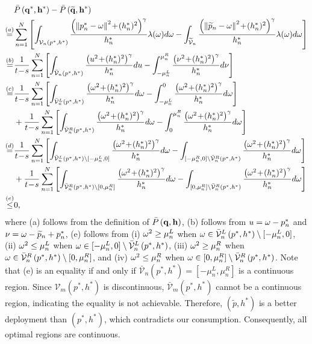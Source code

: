 \documentclass[smallabstract,smallcaptions]{dccpaper}
\renewcommand{\vp}{\mathbf q}
\newcommand{\df}{\ensuremath{\lam}}         %
\newcommand{\bP}{\ensuremath{\vp}}          %
\newcommand{\abPo}{\ensuremath{\bar{P}}}  %
\newcommand{\bH}{\ensuremath{\vh}}          %
\newcommand{\Vor}{\ensuremath{\mathcal{V}}}         %
\begin{document}
\begin{equation}
\begin{aligned}
    &\abPo\left(\bP^*,\bH^*\right) - \abPo\left(\widetilde{\bP},\bH^*\right)\\
    \overset{(a)}{=}&\sum_{n=1}^{N}\left[\int_{\Vor_n\left(p^*, h^*\right)}  \frac{ \left(\Norm{p^*_n- \ome}^2 \!+\!(h^*_n)^2\right)^{\gam}}{h^*_n} \df(\ome)d\ome-\int_{\widetilde{\Vor}_{n}} \frac{ \left(\Norm{\widetilde{p}_n- \ome}^2 \!+\!(h^*_n)^2\right)^{\gam}}{h^*_n} \df(\ome)d\ome\right]\\
    \overset{(b)}{=}&\frac{1}{t\!-\!s}\sum_{n=1}^{N}\left[\int_{\bar{\Vor}_n\left(p^*, h^*\right)}  \frac{ \left(u^2 \!+\!(h^*_n)^2\right)^{\gam}}{h^*_n} du-\int_{-\mu^L_n}^{\mu^R_n} \frac{ \left(\nu^2 \!+\!(h^*_n)^2\right)^{\gam}}{h^*_n} d\nu\right]\\
    \overset{(c)}{=}&\frac{1}{t\!-\!s}\sum_{n=1}^{N}\left[\int_{\bar{\Vor}^L_n\left(p^*, h^*\right)}  \frac{ \left(\ome^2 \!+\!(h^*_n)^2\right)^{\gam}}{h^*_n} d\ome-\int_{-\mu^L_n}^{0} \frac{ \left(\ome^2 \!+\!(h^*_n)^2\right)^{\gam}}{h^*_n} d\ome\right]\\
    &+\frac{1}{t\!-\!s}\sum_{n=1}^{N}\left[\int_{\bar{\Vor}^R_n\left(p^*, h^*\right)}  \frac{ \left(\ome^2 \!+\!(h^*_n)^2\right)^{\gam}}{h^*_n} d\ome-\int_{0}^{\mu^R_n} \frac{ \left(\ome^2 \!+\!(h^*_n)^2\right)^{\gam}}{h^*_n} d\ome\right]\\
    \overset{(d)}{=}&\frac{1}{t\!-\!s}\sum_{n=1}^{N}\left[\int_{\bar{\Vor}^L_n\left(p^*, h^*\right)\setminus[-\mu^L_n, 0]}  \frac{ \left(\ome^2 \!+\!(h^*_n)^2\right)^{\gam}}{h^*_n} d\ome-\int_{[ -\mu^R_n,0]\setminus\bar{\Vor}^R_n\left(p^*, h^*\right)} \frac{ \left(\ome^2 \!+\!(h^*_n)^2\right)^{\gam}}{h^*_n} d\ome\right]\\
    &+\frac{1}{t\!-\!s}\sum_{n=1}^{N}\left[\int_{\bar{\Vor}^R_n\left(p^*, h^*\right)\setminus[0, \mu^R_n]}  \frac{ \left(\ome^2 \!+\!(h^*_n)^2\right)^{\gam}}{h^*_n} d\ome-\int_{[0, \mu^R_n]\setminus\bar{\Vor}^R_n\left(p^*, h^*\right)} \frac{ \left(\ome^2 \!+\!(h^*_n)^2\right)^{\gam}}{h^*_n} d\ome\right]\\
    \overset{(e)}{\le}&0,
\end{aligned}
\end{equation}
where (a) follows from the definition of $\abPo\left(\bP,\bH\right)$, (b) follows from $u=\omega-p^*_n$ and $\nu=\omega-\widetilde{p}_n+p^*_n$, (e) follows from (i) $\omega^2\ge\mu^L_n$ when $\ome\in\bar{\Vor}^L_n\left(p^*, h^*\right)\setminus[-\mu^L_n, 0]$, (ii)  $\omega^2\le\mu^L_n$ when $\ome\in[-\mu^L_n, 0]\setminus\bar{\Vor}^L_n\left(p^*, h^*\right)$, (iii) $\omega^2\ge\mu^R_n$ when $\ome\in\bar{\Vor}^R_n\left(p^*, h^*\right)\setminus[0, \mu^R_n]$, and (iv) $\omega^2\le\mu^R_n$ when $\ome\in[0, \mu^R_n]\setminus\bar{\Vor}^R_n\left(p^*, h^*\right)$.
Note that (e) is an equality if and only if $\bar{\Vor}_n\left(p^*, h^*\right)=[-\mu^L_n,\mu^R_n]$ is a continuous region.
Since $\Vor_m\left(p^*, h^*\right)$ is discontinuous, $\bar{\Vor}_m\left(p^*, h^*\right)$ cannot be a continuous region, indicating the equality is not achievable.
Therefore, $(\widetilde{p}, h^*)$ is a better deployment than $(p^*, h^*)$, which contradicts our consumption.
Consequently, all optimal regions are continuous.
\end{document}
